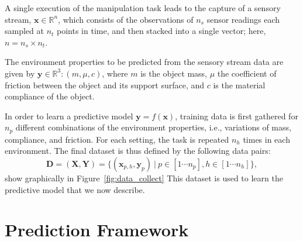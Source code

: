 

A single execution of the manipulation task leads to the capture of a sensory stream, $\mathbf{x}\in\mathbb{R}^{n}$, which consists of the observations of $n_s$ sensor readings each sampled at $n_t$ points in time, and then stacked into a single vector; here, $n=n_s \times n_t$. 

The environment properties to be predicted from the sensory stream data are given by $\mathbf{y}\in\mathbb{R}^{3}: (m,\mu,c)$, where $m$ is the object mass, $\mu$ the coefficient of friction between the object and its support surface, and $c$ is the material compliance of the object.

In order to learn a predictive model $\mathbf{y}=f(\mathbf{x})$, training data is first gathered for $n_p$ different combinations of the environment properties, i.e., variations of mass, compliance, and friction.
For each setting, the task is repeated $n_h$ times in each environment.
The final dataset is thus defined by the following data pairs:
\begin{equation}   \mathbf{D} = (\mathbf{X},\mathbf{Y}) = \{ (\mathbf{x}_{p,h},\mathbf{y}_{p})~\lvert~p\in[1\cdots n_p],h\in[1\cdots n_h] \}, \end{equation} 
show graphically in Figure~\ref{fig:data_collect}
This dataset is used to learn the predictive model that we now describe.


\section{Prediction Framework}

